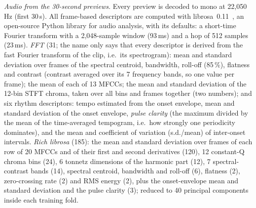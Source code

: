 \emph{Audio from the 30-second previews.} Every preview is decoded to mono at 22{,}050\,Hz (first 30\,s). All
frame-based descriptors are computed with librosa~0.11~\cite{mcfee2015librosa}, an open-source Python library for
audio analysis, with its defaults: a short-time Fourier transform with a 2{,}048-sample window
(93\,ms) and a hop of 512 samples (23\,ms). \emph{FFT} (31; the name only says that every descriptor is derived from
the fast Fourier transform of the clip, i.e.\ its spectrogram): mean and standard deviation over frames of the
spectral centroid, bandwidth, roll-off (85\,\%), flatness and contrast (contrast averaged over its 7 frequency
bands, so one value per frame); the mean of each of 13 MFCCs; the mean and standard deviation of the 12-bin
STFT chroma, taken over all bins and frames together (two numbers); and six rhythm descriptors: tempo estimated from the onset envelope, mean and
standard deviation of the onset envelope, \emph{pulse clarity} (the maximum divided by the mean of the
time-averaged tempogram, i.e.\ how strongly one periodicity dominates), and the mean and coefficient of variation
(s.d./mean) of inter-onset intervals. \emph{Rich librosa} (185): the mean and standard deviation over frames
of each row of 20 MFCCs and of their first and second derivatives (120), 12 constant-Q chroma bins (24), 6 tonnetz
dimensions of the harmonic part (12), 7 spectral-contrast bands (14), spectral centroid, bandwidth and roll-off
(6), flatness (2), zero-crossing rate (2) and RMS energy (2), plus the onset-envelope mean and standard deviation
and the pulse clarity (3); reduced to 40 principal components inside each training fold.

